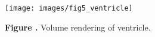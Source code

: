 \documentclass{frontiersMED} %
\begin{document}
\begin{figure}
\begin{center}
\texttt{[image: images/fig5\_ventricle]}
\end{center}
 \textbf{\label{fig:05} Figure .}{ Volume rendering of ventricle. }
\end{figure}






\end{document}
